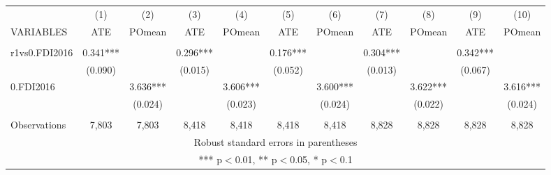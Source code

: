 \documentclass[]{article}
\begin{document}
\begin{tabular}{lcccccccccc} \hline
 & (1) & (2) & (3) & (4) & (5) & (6) & (7) & (8) & (9) & (10) \\
VARIABLES & ATE & POmean & ATE & POmean & ATE & POmean & ATE & POmean & ATE & POmean \\ \hline
 &  &  &  &  &  &  &  &  &  &  \\
r1vs0.FDI2016 & 0.341*** &  & 0.296*** &  & 0.176*** &  & 0.304*** &  & 0.342*** &  \\
 & (0.090) &  & (0.015) &  & (0.052) &  & (0.013) &  & (0.067) &  \\
0.FDI2016 &  & 3.636*** &  & 3.606*** &  & 3.600*** &  & 3.622*** &  & 3.616*** \\
 &  & (0.024) &  & (0.023) &  & (0.024) &  & (0.022) &  & (0.024) \\
 &  &  &  &  &  &  &  &  &  &  \\
 Observations & 7,803 & 7,803 & 8,418 & 8,418 & 8,418 & 8,418 & 8,828 & 8,828 & 8,828 & 8,828 \\ \hline
\multicolumn{11}{c}{ Robust standard errors in parentheses} \\
\multicolumn{11}{c}{ *** p$<$0.01, ** p$<$0.05, * p$<$0.1} \\
\end{tabular}
\end{document}
